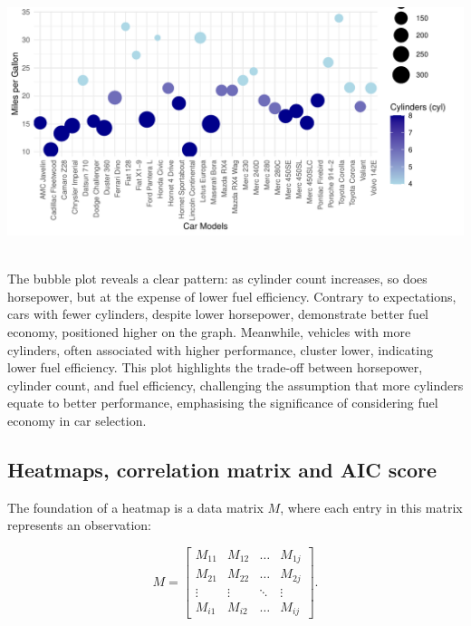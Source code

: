 \documentclass{article}\usepackage[]{graphicx}\usepackage[]{xcolor}
\makeatletter
\def\maxwidth{ %
  \ifdim\Gin@nat@width>\linewidth
    \linewidth
  \else
    \Gin@nat@width
  \fi
}
\newenvironment{knitrout}{}{} %
\makeatother
\begin{document}
\begin{knitrout}\scriptsize
{}\color{fgcolor}

{\centering \includegraphics[width=\maxwidth]{figure/beamer-bubble-plot-1} 

}


\end{knitrout}

\\\noindent The bubble plot reveals a clear pattern: as cylinder count increases, so does horsepower, but at the expense of lower fuel efficiency. Contrary to expectations, cars with fewer cylinders, despite lower horsepower, demonstrate better fuel economy, positioned higher on the graph. Meanwhile, vehicles with more cylinders, often associated with higher performance, cluster lower, indicating lower fuel efficiency. This plot highlights the trade-off between horsepower, cylinder count, and fuel efficiency, challenging the assumption that more cylinders equate to better performance, emphasising the significance of considering fuel economy in car selection.

\subsection{Heatmaps, correlation matrix and AIC score}

The foundation of a heatmap is a data matrix $M$, where each entry in this matrix represents an observation:

$$M =
\left[
\begin{array}{cccc}
    M_{11} & M_{12} & \ldots & M_{1j} \\  
    M_{21} & M_{22} & \ldots & M_{2j} \\  
    \vdots & \vdots & \ddots & \vdots \\  
    M_{i1} & M_{i2} & \ldots & M_{ij}
\end{array}
\right].
$$
\end{document}
